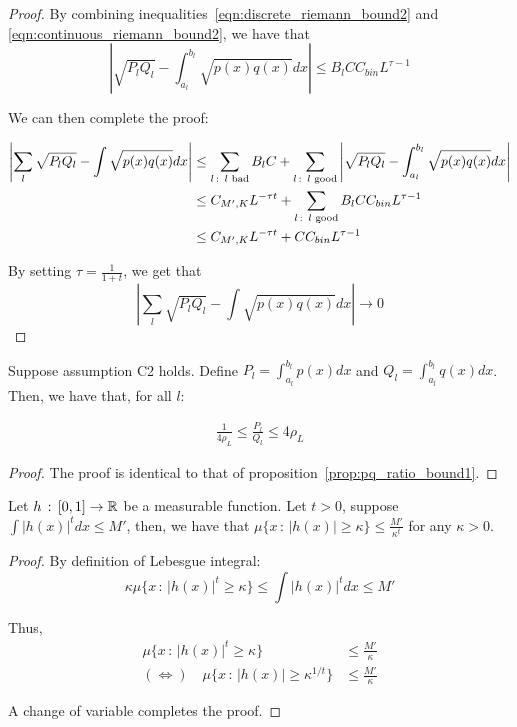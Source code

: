 \begin{proof}
By combining inequalities~\eqref{eqn:discrete_riemann_bound2} and \eqref{eqn:continuous_riemann_bound2}, we have that
\[
\left| \sqrt{P_l Q_l} - \int_{a_l}^{b_l} \sqrt{p(x) q(x)} dx \right| \leq B_l C C_{bin} L^{\tau - 1}
\]

We can then complete the proof:

\begin{align*}
\left| \sum_l \sqrt{P_l Q_l} - \int \sqrt{p(x) q(x)} dx \right| &\leq
   \sum_{l \,:\, \textrm{ $l$ bad}} B_l C + 
   \sum_{l \,:\, \textrm{ $l$ good}} \left| \sqrt{P_l Q_l} - \int_{a_l}^{b_l} \sqrt{ p(x) q(x)} dx \right| \\
  & \leq C_{M',K} L^{ - \tau t} + \sum_{l \,:\, \textrm{ $l$ good}} B_l C C_{bin} L^{\tau - 1} \\
  & \leq  C_{M',K} L^{ - \tau t} + C C_{bin} L^{\tau - 1}
\end{align*}

By setting $\tau = \frac{1}{1+t}$, we get that
\[
\left| \sum_l \sqrt{P_l Q_l} - \int \sqrt{p(x) q(x)} dx \right| \rightarrow 0 
\]

\end{proof}



\begin{proposition}
\label{prop:pq_ratio_bound2}
Suppose assumption C2 holds. Define $P_l = \int_{a_l}^{b_l} p(x) dx$ and $Q_l = \int_{a_l}^{b_l} q(x) dx$. Then, we have that, for all $l$:

\begin{align*}
\frac{1}{4 \rho_L} \leq \frac{P_l}{Q_l} \leq 4 \rho_L 
\end{align*}

\end{proposition}


\begin{proof}
The proof is identical to that of proposition~\ref{prop:pq_ratio_bound1}.

\end{proof}





\begin{lemma}
\label{lem:level_set_control}
Let $h \,:\, [0,1] \rightarrow {\mathbb R}$ be a measurable function. Let $t > 0$, suppose $\int |h(x)|^t dx \leq M'$, then, we have that 
$\mu \{ x \,:\, |h(x)| \geq \kappa \} \leq \frac{M'}{\kappa^t} $ for any $\kappa > 0$.
\end{lemma}

\begin{proof}
By definition of Lebesgue integral:
\[
\kappa \mu\{ x \,:\, |h(x)|^t \geq \kappa \} \leq \int |h(x)|^t dx \leq M'
\]

Thus,
\begin{align*}
\mu\{ x \,:\, |h(x)|^t \geq \kappa \} &\leq \frac{M'}{\kappa} \\
(\Leftrightarrow) \quad \mu\{ x \,:\, |h(x)| \geq \kappa^{1/t} \} &\leq \frac{M'}{\kappa}
\end{align*}

A change of variable completes the proof.

\end{proof}



